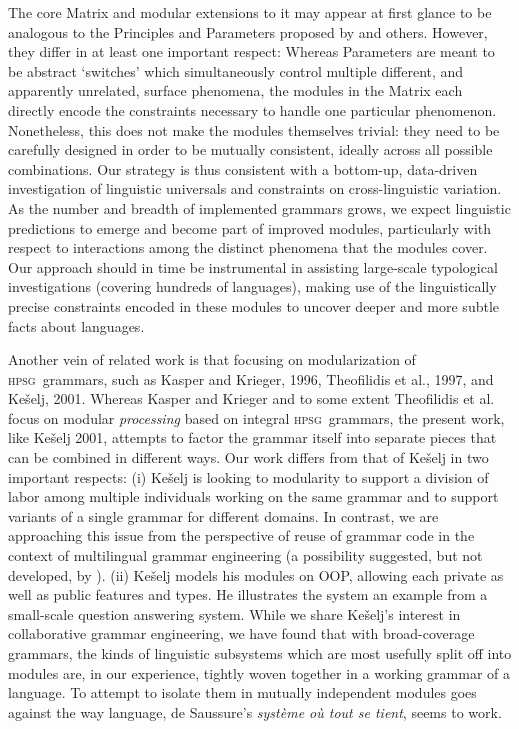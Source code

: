 \documentclass[11pt]{article}
\newcommand{\hpsg}{\textsc{hpsg}}
\begin{document}
The core Matrix and modular extensions to it may appear at first
glance to be analogous to the Principles and Parameters proposed by
 and others.  However, they differ in at least one
important respect: Whereas Parameters are meant to be abstract
`switches' which simultaneously control multiple different, and
apparently unrelated, surface phenomena, the modules in the Matrix
each directly encode the constraints necessary to handle one
particular phenomenon.  Nonetheless, this does not make the modules
themselves trivial: they need to be carefully designed in order to be
mutually consistent, ideally across all possible combinations.  Our
strategy is thus consistent with a bottom-up, data-driven
investigation of linguistic universals and constraints on
cross-linguistic variation.  As the number and breadth of implemented
grammars grows, we expect linguistic predictions to emerge and become
part of improved modules, particularly with respect to interactions
among the distinct phenomena that the modules cover.  Our approach
should in time be instrumental in assisting large-scale typological
investigations (covering hundreds of languages), making use of the
linguistically precise constraints encoded in these modules to uncover
deeper and more subtle facts about languages.

Another vein of related work is that focusing on modularization of
\hpsg\ grammars, such as Kasper and Krieger,
1996\nocite{Kasper:Krieger:96}, Theofilidis et al.,
1997\nocite{Theofilidis:etal:97}, and Ke{\v{s}}elj,
2001\nocite{Keselj:01}. Whereas Kasper and Krieger
\nocite{Kasper:Krieger:96} and to some extent Theofilidis et al.\
\nocite{Theofilidis:etal:97} focus on modular {\it processing} based
on integral \hpsg\ grammars, the present work, like Ke{\v{s}}elj
2001\nocite{Keselj:01}, attempts to factor the grammar itself into
separate pieces that can be combined in different ways.  Our work
differs from that of Ke{\v{s}}elj\nocite{Keselj:01} in two important
respects: (i) Ke{\v{s}}elj\nocite{Keselj:01} is looking to modularity to
support a division of labor among multiple individuals working on the
same grammar and to support variants of a single grammar for different
domains.  In contrast, we are approaching this issue from the
perspective of reuse of grammar code in the context of multilingual
grammar engineering (a possibility suggested, but not developed, by
\newcite{Theofilidis:etal:97}). (ii) Ke{\v{s}}elj\nocite{Keselj:01} models
his modules on OOP, allowing each private as well as public features
and types.  He illustrates the system an example from a small-scale
question answering system.  While we share \nocite{Keselj:01}Ke{\v{s}}elj's
interest in collaborative grammar engineering, we have found that with
broad-coverage grammars, the kinds of linguistic subsystems which are
most usefully split off into modules are, in our experience, tightly
woven together in a working grammar of a language.  To attempt to
isolate them in mutually independent modules goes against the way
language, de Saussure's {\it syst\`eme o\`u tout se tient}, seems to
work.
\end{document}
